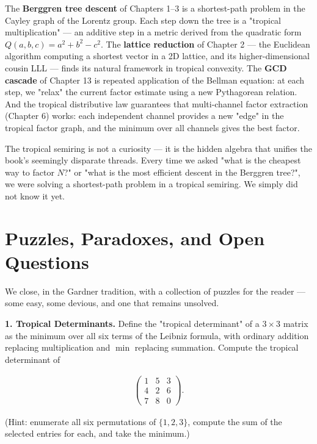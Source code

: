 \documentclass[11pt,twoside,openright]{book}
\theoremstyle{definition}
\theoremstyle{remark}
\begin{document}
The \textbf{Berggren tree descent} of Chapters 1--3 is a shortest-path problem in the Cayley graph of the Lorentz group. Each step down the tree is a "tropical multiplication" --- an additive step in a metric derived from the quadratic form $Q(a,b,c) = a^2 + b^2 - c^2$. The \textbf{lattice reduction} of Chapter 2 --- the Euclidean algorithm computing a shortest vector in a 2D lattice, and its higher-dimensional cousin LLL --- finds its natural framework in tropical convexity. The \textbf{GCD cascade} of Chapter 13 is repeated application of the Bellman equation: at each step, we "relax" the current factor estimate using a new Pythagorean relation. And the tropical distributive law guarantees that multi-channel factor extraction (Chapter 6) works: each independent channel provides a new "edge" in the tropical factor graph, and the minimum over all channels gives the best factor.


The tropical semiring is not a curiosity --- it is the hidden algebra that unifies the book's seemingly disparate threads. Every time we asked "what is the cheapest way to factor $N$?" or "what is the most efficient descent in the Berggren tree?", we were solving a shortest-path problem in a tropical semiring. We simply did not know it yet.


\section{Puzzles, Paradoxes, and Open Questions}

We close, in the Gardner tradition, with a collection of puzzles for the reader --- some easy, some devious, and one that remains unsolved.

\textbf{1. Tropical Determinants.} Define the "tropical determinant" of a $3 \times 3$ matrix as the minimum over all six terms of the Leibniz formula, with ordinary addition replacing multiplication and $\min$ replacing summation. Compute the tropical determinant of

\begin{align*}
\begin{pmatrix} 1 & 5 & 3 \\ 4 & 2 & 6 \\ 7 & 8 & 0 \end{pmatrix}.
\end{align*}

(Hint: enumerate all six permutations of $\{1, 2, 3\}$, compute the sum of the selected entries for each, and take the minimum.)
\end{document}
